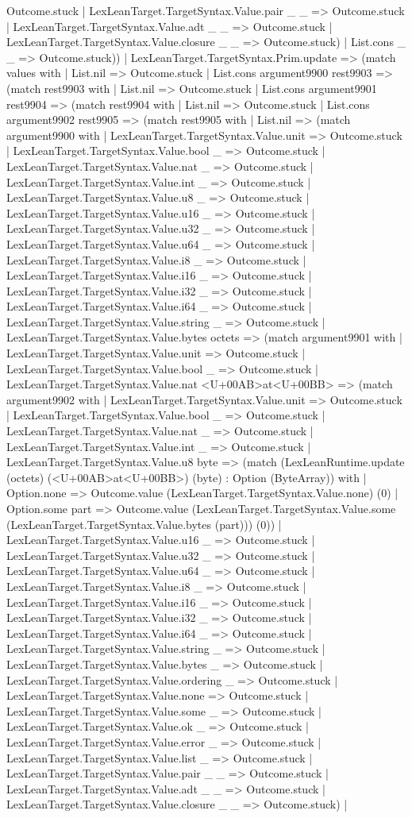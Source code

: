 \documentclass[11pt]{article}
\begin{document}
Outcome.stuck | LexLeanTarget.TargetSyntax.Value.pair \_ \_ => Outcome.stuck | LexLeanTarget.TargetSyntax.Value.adt \_ \_ => Outcome.stuck | LexLeanTarget.TargetSyntax.Value.closure \_ \_ => Outcome.stuck) | List.cons \_ \_ => Outcome.stuck)) | LexLeanTarget.TargetSyntax.Prim.update => (match values with | List.nil => Outcome.stuck | List.cons argument9900 rest9903 => (match rest9903 with | List.nil => Outcome.stuck | List.cons argument9901 rest9904 => (match rest9904 with | List.nil => Outcome.stuck | List.cons argument9902 rest9905 => (match rest9905 with | List.nil => (match argument9900 with | LexLeanTarget.TargetSyntax.Value.unit => Outcome.stuck | LexLeanTarget.TargetSyntax.Value.bool \_ => Outcome.stuck | LexLeanTarget.TargetSyntax.Value.nat \_ => Outcome.stuck | LexLeanTarget.TargetSyntax.Value.int \_ => Outcome.stuck | LexLeanTarget.TargetSyntax.Value.u8 \_ => Outcome.stuck | LexLeanTarget.TargetSyntax.Value.u16 \_ => Outcome.stuck | LexLeanTarget.TargetSyntax.Value.u32 \_ => Outcome.stuck | LexLeanTarget.TargetSyntax.Value.u64 \_ => Outcome.stuck | LexLeanTarget.TargetSyntax.Value.i8 \_ => Outcome.stuck | LexLeanTarget.TargetSyntax.Value.i16 \_ => Outcome.stuck | LexLeanTarget.TargetSyntax.Value.i32 \_ => Outcome.stuck | LexLeanTarget.TargetSyntax.Value.i64 \_ => Outcome.stuck | LexLeanTarget.TargetSyntax.Value.string \_ => Outcome.stuck | LexLeanTarget.TargetSyntax.Value.bytes octets => (match argument9901 with | LexLeanTarget.TargetSyntax.Value.unit => Outcome.stuck | LexLeanTarget.TargetSyntax.Value.bool \_ => Outcome.stuck | LexLeanTarget.TargetSyntax.Value.nat <U+00AB>at<U+00BB> => (match argument9902 with | LexLeanTarget.TargetSyntax.Value.unit => Outcome.stuck | LexLeanTarget.TargetSyntax.Value.bool \_ => Outcome.stuck | LexLeanTarget.TargetSyntax.Value.nat \_ => Outcome.stuck | LexLeanTarget.TargetSyntax.Value.int \_ => Outcome.stuck | LexLeanTarget.TargetSyntax.Value.u8 byte => (match (LexLeanRuntime.update (octets) (<U+00AB>at<U+00BB>) (byte) : Option (ByteArray)) with | Option.none => Outcome.value (LexLeanTarget.TargetSyntax.Value.none) (0) | Option.some part => Outcome.value (LexLeanTarget.TargetSyntax.Value.some (LexLeanTarget.TargetSyntax.Value.bytes (part))) (0)) | LexLeanTarget.TargetSyntax.Value.u16 \_ => Outcome.stuck | LexLeanTarget.TargetSyntax.Value.u32 \_ => Outcome.stuck | LexLeanTarget.TargetSyntax.Value.u64 \_ => Outcome.stuck | LexLeanTarget.TargetSyntax.Value.i8 \_ => Outcome.stuck | LexLeanTarget.TargetSyntax.Value.i16 \_ => Outcome.stuck | LexLeanTarget.TargetSyntax.Value.i32 \_ => Outcome.stuck | LexLeanTarget.TargetSyntax.Value.i64 \_ => Outcome.stuck | LexLeanTarget.TargetSyntax.Value.string \_ => Outcome.stuck | LexLeanTarget.TargetSyntax.Value.bytes \_ => Outcome.stuck | LexLeanTarget.TargetSyntax.Value.ordering \_ => Outcome.stuck | LexLeanTarget.TargetSyntax.Value.none => Outcome.stuck | LexLeanTarget.TargetSyntax.Value.some \_ => Outcome.stuck | LexLeanTarget.TargetSyntax.Value.ok \_ => Outcome.stuck | LexLeanTarget.TargetSyntax.Value.error \_ => Outcome.stuck | LexLeanTarget.TargetSyntax.Value.list \_ => Outcome.stuck | LexLeanTarget.TargetSyntax.Value.pair \_ \_ => Outcome.stuck | LexLeanTarget.TargetSyntax.Value.adt \_ \_ => Outcome.stuck | LexLeanTarget.TargetSyntax.Value.closure \_ \_ => Outcome.stuck) | 
\end{document}
